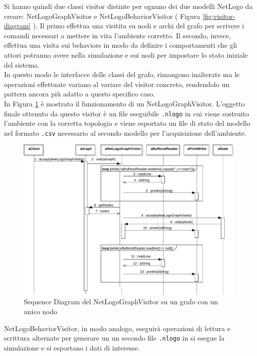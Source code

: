 Si hanno quindi due classi visitor distinte per ognuno dei due modelli NetLogo da creare: NetLogoGraphVisitor e NetLogoBehaviorVisitor ( Figura \ref{fig:visitor-diagram} ). Il primo effettua una visitita su nodi e archi del grafo per scrivere i comandi necessari a mettere in vita l'ambiente corretto. Il secondo, invece, effettua una visita sui behaviors in modo da definire i comportamenti che gli attori potranno avere nella simulazione e sui nodi per impostare lo stato iniziale del sistema.\\
In questo modo le interfacce delle classi del grafo, rimangono inalterate ma le operazioni effettuate variano al variare del visitor concreto, rendendolo un pattern ancora più adatto a questo specifico caso.\\
In Figura \ref{fig:visitor-sequence} è mostrato il funzionamento di un NetLogoGraphVisitor. L'oggetto finale ottenuto da questo visitor è un file eseguibile \texttt{.nlogo} in cui viene costruito l'ambiente con la corretta topologia e viene esportato un file di stato del modello nel formato \texttt{.csv} necessario al secondo modello per l'acquisizione dell'ambiente.\\
\begin{figure}[htbp]
\centering
\includegraphics[width=\textwidth,height=\textheight,keepaspectratio]{images/visitor-sequence.pdf}
\caption{Sequence Diagram del NetLogoGraphVisitor su un grafo con un unico nodo}
\label{fig:visitor-sequence}
\end{figure}
NetLogoBehaviorVisitor, in modo analogo, eseguirà operazioni di lettura e scrittura alternate per generare un un secondo file \texttt{.nlogo} in si esegue la simulazione e si esportano i dati di interesse.

